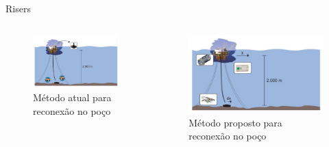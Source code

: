 \documentclass[10pt]{beamer}
\begin{document}
\begin{frame}[fragile]{Risers}
  \begin{columns}[T] %
\begin{column}{.5\textwidth}

\begin{figure}[!ht]
\centering
\includegraphics[width=1\linewidth]{figures/introducao/posicionamentoAtual}
\caption{Método atual para reconexão no poço \cite{redytton}}
\end{figure}


\end{column}%
\hfill%
\begin{column}{.5\textwidth}

\begin{figure}[!ht]
\centering
\includegraphics[width=1\linewidth]{figures/introducao/posicionamentoProposto}
\caption{Método proposto para reconexão no poço \cite{redytton}}
\end{figure}

\end{column}%
\end{columns}

\end{frame}
\end{document}
